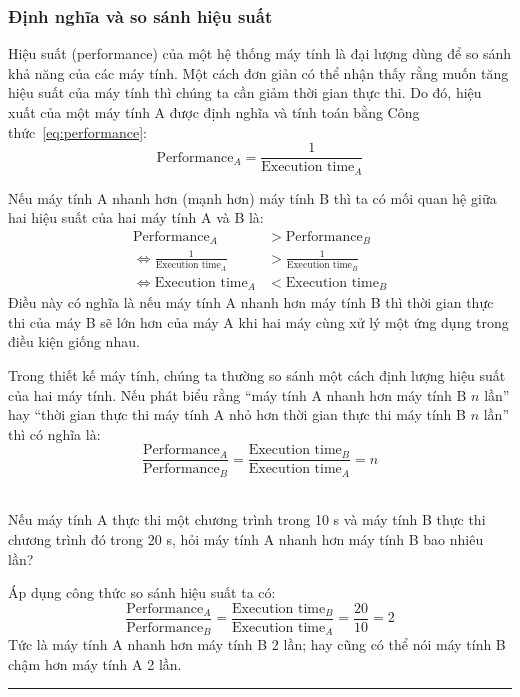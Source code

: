 \subsubsection{Định nghĩa và so sánh hiệu suất}
Hiệu suất (performance) của một hệ thống máy tính là đại lượng dùng để so sánh khả năng của các máy tính. Một cách đơn giản có thể nhận thấy rằng muốn tăng hiệu suất của máy tính thì chúng ta cần giảm thời gian thực thi. Do đó, hiệu xuất của một máy tính A được định nghĩa và tính toán bằng Công thức~\ref{eq:performance}:
\begin{equation}
\label{eq:performance}
\text{Performance}_A = \frac{1}{{\text{Execution time}}_A}
\end{equation}

Nếu máy tính A nhanh hơn (mạnh hơn) máy tính B thì ta có mối quan hệ giữa hai hiệu suất của hai máy tính A và B là:
\begin{align*}
\text{Performance}_A &> \text{Performance}_B\\
\Leftrightarrow \frac{1}{\text{Execution time}_A} &> \frac{1}{\text{Execution time}_B}\\
\Leftrightarrow {\text{Execution time}_A} &< {\text{Execution time}_B}
\end{align*}
Điều này có nghĩa là nếu máy tính A nhanh hơn máy tính B thì thời gian thực thi của máy B sẽ lớn hơn của máy A khi hai máy cùng xử lý một ứng dụng trong điều kiện giống nhau.

Trong thiết kế máy tính, chúng ta thường so sánh một cách định lượng hiệu suất của hai máy tính. Nếu phát biểu rằng ``máy tính A nhanh hơn máy tính B $n$ lần'' hay ``thời gian thực thi máy tính A nhỏ hơn thời gian thực thi máy tính B $n$ lần'' thì có nghĩa là:
\begin{equation*}
\frac{\text{Performance}_A}{\text{Performance}_B} = \frac{\text{Execution time}_B}{\text{Execution time}_A} = n
\end{equation*}


\begin{exmp}
\hrulefill\\
Nếu máy tính A thực thi một chương trình trong 10 s và máy tính B thực thi chương trình đó trong 20 s, hỏi máy tính A nhanh hơn máy tính B bao nhiêu lần?
\end{exmp}
\begin{answ}
Áp dụng công thức so sánh hiệu suất ta có:
\begin{equation*}
\frac{\text{Performance}_A}{\text{Performance}_B} = \frac{\text{Execution time}_B}{\text{Execution time}_A} = \frac{20}{10} = 2
\end{equation*}
Tức là máy tính A nhanh hơn máy tính B 2 lần; hay cũng có thể nói máy tính B chậm hơn máy tính A 2 lần.\\
\hrule
\end{answ}

